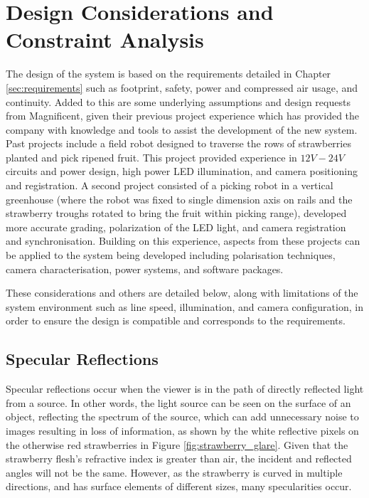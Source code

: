 \documentclass[fleqn,twoside,12pt]{report}
\begin{document}
\section{Design Considerations and Constraint Analysis}
\label{sec:challenges}


The design of the system is based on the requirements detailed in Chapter \ref{sec:requirements} such as footprint, safety, power and compressed air usage, and continuity. Added to this are some underlying assumptions and design requests from Magnificent, given their previous project experience which has provided the company with knowledge and tools to assist the development of the new system. Past projects include a field robot designed to traverse the rows of strawberries planted and pick ripened fruit. This project provided experience in $12V-24V$ circuits and power design, high power LED illumination, and camera positioning and registration. A second project consisted of a picking robot in a vertical greenhouse (where the robot was fixed to single dimension axis on rails and the strawberry troughs rotated to bring the fruit within picking range), developed more accurate grading, polarization of the LED light, and camera registration and synchronisation. Building on this experience, aspects from these projects can be applied to the system being developed including polarisation techniques, camera characterisation, power systems, and software packages.

These considerations and others are detailed below, along with limitations of the system environment such as line speed, illumination, and camera configuration, in order to ensure the design is compatible and corresponds to the requirements. 


\subsection{Specular Reflections}

Specular reflections occur when the viewer is in the path of directly reflected light from a source. In other words, the light source can be seen on the surface of an object, reflecting the spectrum of the source, which can add unnecessary noise to images resulting in loss of information, as shown by the white reflective pixels on the otherwise red strawberries in Figure \ref{fig:strawberry_glare}\cite{gurney}. Given that the strawberry flesh's refractive index is greater than air, the incident and reflected angles will not be the same. However, as the strawberry is curved in multiple directions, and has surface elements of different sizes, many specularities occur. 
\end{document}
